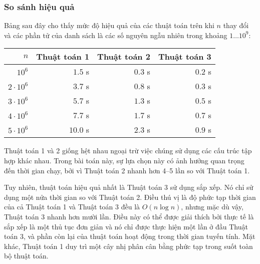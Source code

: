 \subsubsection{So sánh hiệu quả}

Bảng sau đây cho thấy mức độ hiệu quả
của các thuật toán trên khi $n$ thay đổi và
các phần tử của danh sách là các số nguyên
ngẫu nhiên trong khoảng $1 \ldots 10^9$:

\begin{center}
\begin{tabular}{rrrr}
$n$ & Thuật toán 1 & Thuật toán 2 & Thuật toán 3 \\
\hline
$10^6$ & $1.5$ s & $0.3$ s & $0.2$ s \\
$2 \cdot 10^6$ & $3.7$ s & $0.8$ s & $0.3$ s \\
$3 \cdot 10^6$ & $5.7$ s & $1.3$ s & $0.5$ s \\
$4 \cdot 10^6$ & $7.7$ s & $1.7$ s & $0.7$ s \\
$5 \cdot 10^6$ & $10.0$ s & $2.3$ s & $0.9$ s \\
\end{tabular}
\end{center}

Thuật toán 1 và 2 giống hệt nhau ngoại trừ việc
chúng sử dụng các cấu trúc tập hợp khác nhau.
Trong bài toán này, sự lựa chọn này có ảnh hưởng quan trọng đến
thời gian chạy, bởi vì Thuật toán 2
nhanh hơn 4–5 lần so với Thuật toán 1.

Tuy nhiên, thuật toán hiệu quả nhất là Thuật toán 3
sử dụng sắp xếp.
Nó chỉ sử dụng một nửa thời gian so với Thuật toán 2.
Điều thú vị là độ phức tạp thời gian của cả
Thuật toán 1 và Thuật toán 3 đều là $O(n \log n)$,
nhưng mặc dù vậy, Thuật toán 3 nhanh hơn mười lần.
Điều này có thể được giải thích bởi thực tế là
sắp xếp là một thủ tục đơn giản và nó chỉ được thực hiện
một lần ở đầu Thuật toán 3,
và phần còn lại của thuật toán hoạt động trong thời gian tuyến tính.
Mặt khác,
Thuật toán 1 duy trì một cây nhị phân cân bằng phức tạp
trong suốt toàn bộ thuật toán.
